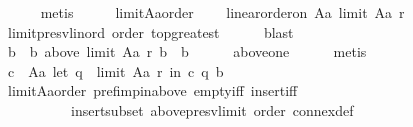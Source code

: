 \begin{isabellebody}
\ \ \ \ \isamarkupfalse%
\ metis\isanewline
\ \ \isamarkupfalse%
\ \isamarkupfalse%
\ limitAa{\isacharunderscore}{\kern0pt}order{\isacharcolon}{\kern0pt}\isanewline
\ \ \ \ {\isachardoublequoteopen}linear{\isacharunderscore}{\kern0pt}order{\isacharunderscore}{\kern0pt}on\ {\isacharparenleft}{\kern0pt}A{\isacharminus}{\kern0pt}{\isacharbraceleft}{\kern0pt}a{\isacharbraceright}{\kern0pt}{\isacharparenright}{\kern0pt}\ {\isacharparenleft}{\kern0pt}limit\ {\isacharparenleft}{\kern0pt}A{\isacharminus}{\kern0pt}{\isacharbraceleft}{\kern0pt}a{\isacharbraceright}{\kern0pt}{\isacharparenright}{\kern0pt}\ r{\isacharparenright}{\kern0pt}{\isachardoublequoteclose}\isanewline
\ \ \ \ \isamarkupfalse%
\ limit{\isacharunderscore}{\kern0pt}presv{\isacharunderscore}{\kern0pt}lin{\isacharunderscore}{\kern0pt}ord\ order\ top{\isacharunderscore}{\kern0pt}greatest\isanewline
\ \ \ \ \isamarkupfalse%
\ blast\isanewline
\ \ \isamarkupfalse%
\ \isamarkupfalse%
\ b\ \ b{\isacharcolon}{\kern0pt}\ {\isachardoublequoteopen}above\ {\isacharparenleft}{\kern0pt}limit\ {\isacharparenleft}{\kern0pt}A{\isacharminus}{\kern0pt}{\isacharbraceleft}{\kern0pt}a{\isacharbraceright}{\kern0pt}{\isacharparenright}{\kern0pt}\ r{\isacharparenright}{\kern0pt}\ b\ {\isacharequal}{\kern0pt}\ {\isacharbraceleft}{\kern0pt}b{\isacharbraceright}{\kern0pt}{\isachardoublequoteclose}\isanewline
\ \ \ \ \isamarkupfalse%
\ above{\isacharunderscore}{\kern0pt}one\isanewline
\ \ \ \ \isamarkupfalse%
\ metis\isanewline
\ \ \isamarkupfalse%
\ {\isachardoublequoteopen}{\isasymforall}c\ {\isasymin}\ A{\isacharminus}{\kern0pt}{\isacharbraceleft}{\kern0pt}a{\isacharbraceright}{\kern0pt}{\isachardot}{\kern0pt}\ let\ q\ {\isacharequal}{\kern0pt}\ limit\ {\isacharparenleft}{\kern0pt}A{\isacharminus}{\kern0pt}{\isacharbraceleft}{\kern0pt}a{\isacharbraceright}{\kern0pt}{\isacharparenright}{\kern0pt}\ r\ in\ {\isacharparenleft}{\kern0pt}c\ {\isasympreceq}\isactrlsub q\ b{\isacharparenright}{\kern0pt}{\isachardoublequoteclose}\isanewline
\ \ \ \ \isamarkupfalse%
\ limitAa{\isacharunderscore}{\kern0pt}order\ pref{\isacharunderscore}{\kern0pt}imp{\isacharunderscore}{\kern0pt}in{\isacharunderscore}{\kern0pt}above\ empty{\isacharunderscore}{\kern0pt}iff\ insert{\isacharunderscore}{\kern0pt}iff\isanewline
\ \ \ \ \ \ \ \ \ \ insert{\isacharunderscore}{\kern0pt}subset\ above{\isacharunderscore}{\kern0pt}presv{\isacharunderscore}{\kern0pt}limit\ order\ connex{\isacharunderscore}{\kern0pt}def\isanewline

\end{isabellebody}
